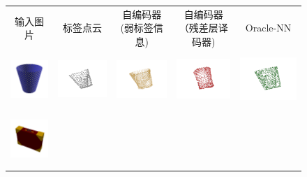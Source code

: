 \documentclass[bachelor, nocolorlinks, printoneside]{seuthesis} %
\begin{document}
\begin{Main}
\begin{figure}[!h]
    \begin{tabular}{c@{}c@{}c@{}c@{}c@{}}
    输入图片 & 标签点云 & \makecell[c]{自编码器 \\(弱标签信息)} & \makecell[c]{自编码器 \\（残差层译码器)} & Oracle-NN\\
    	\includegraphics[width=0.11\columnwidth,height=2cm]{figs/real_dataset/Image/ashcan_ff2f13bc0b9d4ade19c52ba9902b5ab0.png} &
    	\includegraphics[width=0.22\columnwidth,height=2cm]{figs/real_dataset/GT/ashcan_ff2f13bc0b9d4ade19c52ba9902b5ab0_gt.png} &
    	\includegraphics[width=0.22\columnwidth,height=2cm]{figs/real_dataset/AE_label/ashcan_ff2f13bc0b9d4ade19c52ba9902b5ab0_fine.png} &
    	\includegraphics[width=0.22\columnwidth,height=2cm]{figs/real_dataset/AE/ashcan_66d96d2428184442ba6cf6cbb9f4c2bb_fine.png} &
    	\includegraphics[width=0.22\columnwidth,height=2cm]{figs/real_dataset/oracle/ashcan_ff2f13bc0b9d4ade19c52ba9902b5ab0_oracle.png} \\
    	\vspace{-5mm}
    	\includegraphics[width=0.11\columnwidth,height=2cm]{figs/real_dataset/Image/bag_8569a0c606bbba73d9985ad45fbb635e.png} &

\end{tabular}
\end{figure}
\end{Main}
\end{document}
